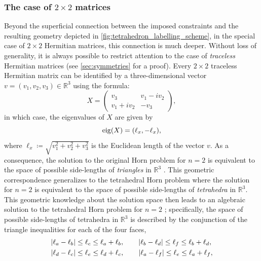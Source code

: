 \documentclass[notitlepage, 11pt, letterpaper]{amsart}
\begin{document}
\subsubsection*{The case of \texorpdfstring{$2 \times 2$}{2 by 2} matrices}
Beyond the superficial connection between the imposed constraints and the resulting geometry depicted in \cref{fig:tetrahedron_labelling_scheme}, in the special case of $2\times 2$ Hermitian matrices, this connection is much deeper.
Without loss of generality, it is always possible to restrict attention to the case of \textit{traceless} Hermitian matrices (see \cref{sec:symmetries} for a proof).
Every $2\times 2$ traceless Hermitian matrix can be identified by a three-dimensional vector $v = (v_1, v_2, v_3) \in \mathbb R^{3}$ using the formula:
\begin{equation}
    X = \begin{pmatrix} v_3 & v_1-iv_2 \\ v_1+iv_2 & -v_3 \end{pmatrix},
\end{equation}
in which case, the eigenvalues of $X$ are given by
\begin{equation}
    \operatorname{eig}(X) = (\ell_x, -\ell_x),
\end{equation}
where $\ell_x \coloneqq \sqrt{v_1^2 + v_2^2 + v_3^2}$ is the Euclidean length of the vector $v$.
As a consequence, the solution to the original Horn problem for $n = 2$ is equivalent to the space of possible side-lengths of \textit{triangles} in $\mathbb R^{3}$ \cite{hausmann1996polygon,freidel2010holomorphic,knutson2000symplectic}.
This geometric correspondence generalizes to the tetrahedral Horn problem where the solution for $n=2$ is equivalent to the space of possible side-lengths of \textit{tetrahedra} in $\mathbb R^{3}$.
This geometric knowledge about the solution space then leads to an algebraic solution to the tetrahedral Horn problem for $n = 2$ \cite{richardson1902trigonometry,wirth2009edge};
specifically, the space of possible side-lengths of tetrahedra in $\mathbb R^3$ is described by the conjunction of the triangle inequalities for each of the four faces,
\begin{align}
    \label{eq:quadruplet_triangle_constraints}
    \begin{split}
        \left|\ell_a-\ell_b\right| &\leq \ell_c \leq \ell_a+\ell_b, \qquad
        \left|\ell_b-\ell_d\right| \leq \ell_f \leq \ell_b+\ell_d, \\
        \left|\ell_d-\ell_c\right| &\leq \ell_e \leq \ell_d+\ell_c, \qquad
        \left|\ell_a-\ell_f\right| \leq \ell_e \leq \ell_a+\ell_f,
    \end{split}
\end{align}
\end{document}
